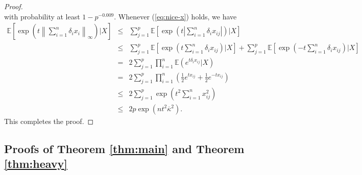 \begin{proof}
\begin{equation}
\end{equation}
with probability at least $1-p^{-0.009}$. Whenever (\ref{eq:nice-x}) holds, we have
\begin{eqnarray*}
\mathbb{E}\left[\exp\left(t\left\|\sum_{i=1}^n\delta_ix_i\right\|_{\infty}\right)\Bigg|X\right] &\leq& \sum_{j=1}^p\mathbb{E}\left[\exp\left(t\left|\sum_{i=1}^n\delta_ix_{ij}\right|\right)\Bigg|X\right] \\
&\leq& \sum_{j=1}^p\mathbb{E}\left[\exp\left(t\sum_{i=1}^n\delta_ix_{ij}\right)\Bigg|X\right] + \sum_{j=1}^p\mathbb{E}\left[\exp\left(-t\sum_{i=1}^n\delta_ix_{ij}\right)\Bigg|X\right] \\
&=& 2\sum_{j=1}^p\prod_{i=1}^n\mathbb{E}\left(e^{t\delta_ix_{ij}}\Big|X\right) \\
&=& 2\sum_{j=1}^p\prod_{i=1}^n\left(\frac{1}{2}e^{tx_{ij}}+\frac{1}{2}e^{-tx_{ij}}\right) \\
&\leq& 2\sum_{j=1}^p\exp\left(t^2\sum_{i=1}^nx_{ij}^2\right) \\
&\leq& 2p\exp\left(nt^2\overline{\kappa}^2\right).
\end{eqnarray*}
This completes the proof.
\end{proof}


\subsection{Proofs of Theorem \ref{thm:main} and Theorem \ref{thm:heavy}}


